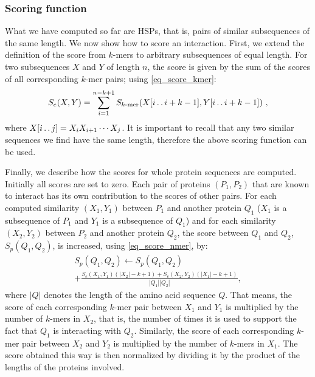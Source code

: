 \subsubsection{Scoring function}
What we have computed so far are HSPs, that is, pairs of similar subsequences of the same length. We now show how to score an interaction. First, we extend the definition of the score from $k$-mers to arbitrary subsequences of equal length. For two subsequences $X$ and $Y$ of length $n$, the score is given by the sum of the scores of all corresponding $k$-mer pairs; using \eqref{eq_score_kmer}:
\begin{equation}\label{eq_score_nmer}
S_e(X,Y) = \sum_{i=1}^{n-k+1}S_\textrm{$k$-mer}(X[i\mathinner{\ldotp\ldotp} i+k-1],Y[i\mathinner{\ldotp\ldotp} i+k-1])\ ,
\end{equation}
where $X[i\mathinner{\ldotp\ldotp} j] = X_iX_{i+1}\cdots X_j$. It is important to recall that any two similar sequences we find have the same length, therefore the above scoring function can be used.

Finally, we describe how the scores for whole protein sequences are computed. Initially all scores are set to zero. Each pair of proteins $(P_1, P_2)$ that are known to interact has its own contribution to the scores of other pairs. For each computed similarity $(X_1,Y_1)$ between $P_1$ and another protein $Q_1$ ($X_1$ is a subsequence of $P_1$ and $Y_1$ is a subsequence of $Q_1$) and for each similarity $(X_2,Y_2)$ between $P_2$ and another protein $Q_2$, the score between $Q_1$ and $Q_2$, $S_p(Q_1,Q_2)$, is increased, using \eqref{eq_score_nmer}, by:
\begin{equation}\label{eq_score_add}
\begin{array}{l}
S_p(Q_1,Q_2)\gets S_p(Q_1,Q_2)\\

 + \displaystyle{\frac{S_e(X_1,Y_1)(|X_2|-k+1)+ S_e(X_2,Y_2)(|X_1|-k+1)}{|Q_1||Q_2|}},
 \end{array}
\end{equation}
where $|Q|$ denotes the length of the amino acid sequence $Q$. That means, the score of each corresponding $k$-mer pair between $X_1$ and $Y_1$ is multiplied by the number of $k$-mers in $X_2$, that is, the number of times it is used to support the fact that $Q_1$ is interacting with $Q_2$. Similarly, the score of each corresponding $k$-mer pair between $X_2$ and $Y_2$ is multiplied by the number of $k$-mers in $X_1$. The score obtained this way is then normalized by dividing it by the product of the lengths of the proteins involved. 


